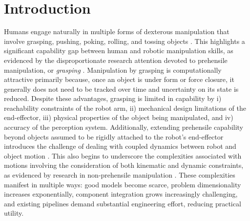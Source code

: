 \chapter{Introduction}
\label{ch:introduction}









Humans engage naturally in multiple forms of dexterous manipulation that involve grasping, pushing, poking, rolling, and tossing objects \cite{bullock2011classifying}.
This highlights a significant capability gap between human and robotic manipulation skills, as evidenced by the disproportionate research attention devoted to prehensile manipulation, or \textsl{grasping} \cite{billard2019trends}.
Manipulation by grasping is computationally attractive primarily because, once an object is under form or force closure, it generally does not need to be tracked over time and uncertainty on its state is reduced.
Despite these advantages, grasping is limited in capability by i) reachability constraints of the robot arm, ii) mechanical design limitations of the end-effector, iii) physical properties of the object being manipulated, and iv) accuracy of the perception system.
Additionally, extending prehensile capability beyond objects assumed to be rigidly attached to the robot's end-effector introduces the challenge of dealing with coupled dynamics between robot and object motion \cite{yin2021modeling,ichnowski2022gomp}.
This also begins to underscore the complexities associated with motions involving the consideration of both kinematic and dynamic constraints, as evidenced by research in non-prehensile manipulation \cite{ruggiero2018nonprehensile}.
These complexities manifest in multiple ways: good models become scarce, problem dimensionality increases exponentially, component integration grows increasingly challenging, and existing pipelines demand substantial engineering effort, reducing practical utility.